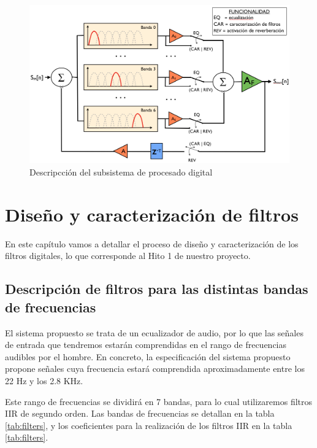 \documentclass[a4paper,12pt]{report}
\begin{document}
\begin{figure}[hbt]
\includegraphics[width=\textwidth]{img/digital_proc.png} 
\caption{Descripcción del subsistema de procesado digital} \label{fig:digproc}
\end{figure}

\chapter{Diseño y caracterización de filtros}
En este capítulo vamos a detallar el proceso de diseño y caracterización de los filtros digitales, lo que corresponde al Hito 1 de nuestro proyecto.

\section{Descripción de filtros para las distintas bandas de frecuencias}
El sistema propuesto se trata de un ecualizador de audio, por lo que las señales de entrada que tendremos estarán comprendidas en el rango de frecuencias audibles por el hombre. En concreto, la especificación del sistema propuesto propone señales cuya frecuencia estará comprendida aproximadamente entre los 22 Hz y los 2.8 KHz.

Este rango de frecuencias se dividirá en 7 bandas, para lo cual utilizaremos filtros IIR de segundo orden. Las bandas de frecuencias se detallan en la tabla \ref{tab:filters}, y los coeficientes para la realización de los filtros IIR en la tabla \ref{tab:filters}.
\end{document}
